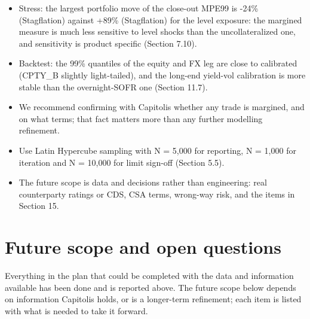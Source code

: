 \documentclass[11pt,letterpaper]{article}
\begin{document}
\begin{itemize}
\item Stress: the largest portfolio move of the close-out MPE99 is -24\% (Stagflation) against +89\% (Stagflation) for the level exposure: the margined measure is much less sensitive to level shocks than the uncollateralized one, and sensitivity is product specific (Section 7.10).
\item Backtest: the 99\% quantiles of the equity and FX leg are close to calibrated (CPTY\_B slightly light-tailed), and the long-end yield-vol calibration is more stable than the overnight-SOFR one (Section 11.7).
\item We recommend confirming with Capitolis whether any trade is margined, and on what terms; that fact matters more than any further modelling refinement.
\item Use Latin Hypercube sampling with N = 5,000 for reporting, N = 1,000 for iteration and N = 10,000 for limit sign-off (Section 5.5).
\item The future scope is data and decisions rather than engineering: real counterparty ratings or CDS, CSA terms, wrong-way risk, and the items in Section 15.
\end{itemize}
\section{Future scope and open questions}
Everything in the plan that could be completed with the data and information available has been done and is reported above. The future scope below depends on information Capitolis holds, or is a longer-term refinement; each item is listed with what is needed to take it forward.
\end{document}
